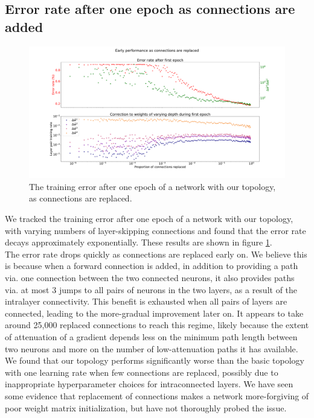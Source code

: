 \documentclass{article}
\newcommand{\npar}{\\\indent}
\begin{document}
\subsection{Error rate after one epoch as connections are added}
\label{sec:mnist_1epoch}

\begin{figure}
  \centering
  \includegraphics[width=\textwidth]{figures/MNIST_one_epoch_performance.pdf}
  \caption{The training error after one epoch of a network with our topology, as connections are replaced.}
  \label{fig:mnist_1epoch}
\end{figure}

We tracked the training error after one epoch of a network with our topology, with varying numbers of layer-skipping connections and found that the error rate decays approximately exponentially. These results are shown in figure \ref{fig:mnist_1epoch}.
\npar
The error rate drops quickly as connections are replaced early on. We believe this is because when a forward connection is added, in addition to providing a path via. one connection between the two connected neurons, it also provides paths via. at most 3 jumps to all pairs of neurons in the two layers, as a result of the intralayer connectivity. This benefit is exhausted when all pairs of layers are connected, leading to the more-gradual improvement later on. It appears to take around 25,000 replaced connections to reach this regime, likely because the extent of attenuation of a gradient depends less on the minimum path length between two neurons and more on the number of low-attenuation paths it has available.
\npar
We found that our topology performs significantly worse than the basic topology with one learning rate when few connections are replaced, possibly due to inappropriate hyperparameter choices for intraconnected layers. We have seen some evidence that replacement of connections makes a network more-forgiving of poor weight matrix initialization, but have not thoroughly probed the issue.
\end{document}
